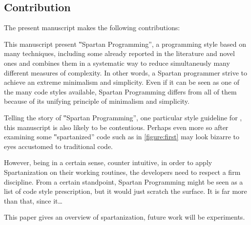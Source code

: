 \subsection{Contribution}

The present manuscript makes the following contributions:

This manuscript present ‟Spartan Programming”, a programming style based on many techniques,
including some already reported in the literature and novel ones and combines them
in a systematic way to reduce simultaneusly many different measures of complexity.
In other words, a Spartan programmer strive to achieve an extreme minimalism and simplicity.
Even if it can be seen as one of the many code styles available, Spartan Programming differs from
all of them because of its unifying principle of minimalism and simplicity.

Telling the story of ‟Spartan Programming”, one particular style guideline for
\Java, this manuscript is also likely to be contentious. Perhaps even more so
after examining some ‟spartanized” code such as in \cref{figure:first}
may look bizarre to eyes accustomed to traditional \Java code.


However, being in a certain sense, counter intuitive, in order to apply
Spartanization on their working routines, the developers need to respect a
firm discipline. From a certain standpoint, Spartan Programming might be
seen as a list of code style prescription, but it would just scratch the
surface. It is far more than that, since it…  

This paper gives an overview of spartanization, future work will be
experiments.

